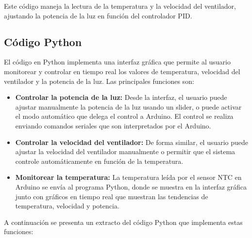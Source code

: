 \documentclass[spanish, a4paper, 11pt]{article}
\begin{document}
Este código maneja la lectura de la temperatura y la velocidad del ventilador, ajustando la potencia de la luz en función del controlador PID.

\subsection{Código Python}

El código en Python implementa una interfaz gráfica que permite al usuario monitorear y controlar en tiempo real los valores de temperatura, velocidad del ventilador y la potencia de la luz. Las principales funciones son:

\begin{itemize}
    \item {\bf Controlar la potencia de la luz:} Desde la interfaz, el usuario puede ajustar manualmente la potencia de la luz usando un slider, o puede activar el modo automático que delega el control a Arduino. El control se realiza enviando comandos seriales que son interpretados por el Arduino.

    \item {\bf Controlar la velocidad del ventilador:} De forma similar, el usuario puede ajustar la velocidad del ventilador manualmente o permitir que el sistema controle automáticamente en función de la temperatura.

    \item {\bf Monitorear la temperatura:} La temperatura leída por el sensor NTC en Arduino se envía al programa Python, donde se muestra en la interfaz gráfica junto con gráficos en tiempo real que muestran las tendencias de temperatura, velocidad y potencia.
\end{itemize}

A continuación se presenta un extracto del código Python que implementa estas funciones:
\end{document}
